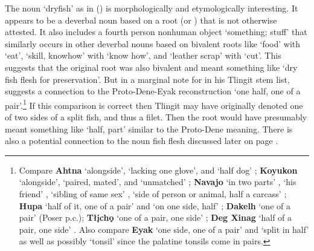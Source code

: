 \label{note:100-dryfish-discussion}
The noun  ‘dryfish’ as in (\lastx) is morphologically and etymologically interesting.
It appears to be a deverbal noun based on a root  (or ) that is not otherwise attested.
It also includes a fourth person nonhuman object  ‘something; stuff’ that similarly occurs in other deverbal nouns based on bivalent roots like  ‘food’ with  ‘eat’,  ‘skill, knowhow’ with  ‘know how’, and  ‘leather scrap’ with  ‘cut’.
This suggests that the original root was also bivalent and meant something like ‘dry fish flesh for preservation’.
But in a marginal note for  in his Tlingit stem list, \textcite[77]{leer:1978b} suggests a connection to the Proto-Dene-Eyak reconstruction  ‘one half, one of a pair’.\footnote{Compare \textbf{Ahtna}  ‘alongside’,  ‘lacking one glove’, and  ‘half dog’ \parencite[258]{kari:1990}; \textbf{Koyukon}  ‘alongside’,  ‘paired, mated’, and  ‘unmatched’ \parencite[356–357]{jette-jones:2000}; \textbf{Navajo}  ‘in two parts’ \parencite[509]{young-morgan:1980},  ‘his friend’ \parencite[895]{young-morgan:1980},  ‘sibling of same sex’ \parencite[83]{young-morgan:1980},  ‘side of person or animal, half a carcass’ \parencite[84]{young-morgan:1980}; \textbf{Hupa}  ‘half of it, one of a pair’ and  ‘on one side, half’ \parencite[43]{golla:1996}; \textbf{Dakelh}  ‘one of a pair’ (Poser p.c.); \textbf{Tłįchǫ}  ‘one of a pair, one side’ \parencite[62]{saxon-siemens:1996}; \textbf{Deg Xinag}  ‘half of a pair, one side’ \parencite[53]{kari:1978}.
Also compare \textbf{Eyak}  ‘one side, one of a pair’ and  ‘split in half’ \parencite[1690–1691]{krauss:1970} as well as possibly  ‘tonsil’ \parencite[1689]{krauss:1970} since the palatine tonsils come in pairs.} If this comparison is correct then Tlingit  may have originally denoted one of two sides of a split fish, and thus a filet.
Then the root would have presumably meant something like ‘half, part’ similar to the Proto-Dene meaning.
There is also a potential connection to the noun  fish flesh discussed later on page \pageref{note:100-fish-flesh-discussion}.

